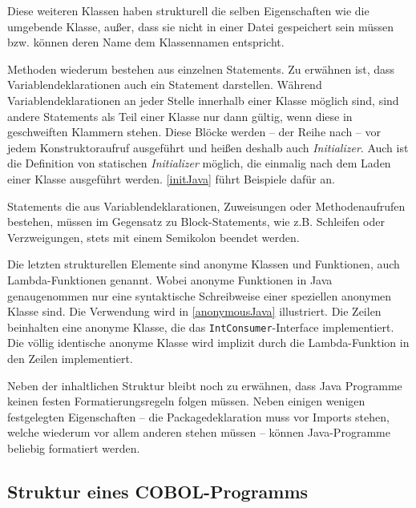 Diese weiteren Klassen haben strukturell die selben Eigenschaften wie die umgebende Klasse, außer, dass sie nicht in einer Datei gespeichert sein müssen bzw. können deren Name dem Klassennamen entspricht.

Methoden wiederum bestehen aus einzelnen Statements. Zu erwähnen ist, dass Variablendeklarationen auch ein Statement darstellen. Während Variablendeklarationen an jeder Stelle innerhalb einer Klasse möglich sind, sind andere Statements als Teil einer Klasse nur dann gültig, wenn diese in geschweiften Klammern stehen. Diese Blöcke werden -- der Reihe nach -- vor jedem Konstruktoraufruf ausgeführt und heißen deshalb auch \textit{Initializer}. Auch ist die Definition von statischen \textit{Initializer} möglich, die einmalig nach dem Laden einer Klasse ausgeführt werden. \autoref{initJava} führt Beispiele dafür an.


Statements die aus Variablendeklarationen, Zuweisungen oder Methodenaufrufen bestehen, müssen im Gegensatz zu Block-Statements, wie z.B. Schleifen oder Verzweigungen, stets mit einem Semikolon beendet werden. 

Die letzten strukturellen Elemente sind anonyme Klassen und Funktionen, auch Lambda-Funktionen genannt. Wobei anonyme Funktionen in Java genaugenommen nur eine syntaktische Schreibweise einer speziellen anonymen Klasse sind. Die Verwendung wird in \autoref{anonymousJava} illustriert. Die Zeilen  beinhalten eine anonyme Klasse, die das \texttt{IntConsumer}-Interface implementiert. Die völlig identische  anonyme Klasse wird implizit durch die Lambda-Funktion in den Zeilen  implementiert.


Neben der inhaltlichen Struktur bleibt noch zu erwähnen, dass Java Programme keinen festen Formatierungsregeln folgen müssen. Neben einigen wenigen festgelegten Eigenschaften -- die Packagedeklaration muss vor Imports stehen, welche wiederum vor allem anderen stehen müssen -- können Java-Programme beliebig formatiert werden.

\subsection*{Struktur eines COBOL-Programms}\label{cobolstructure}

